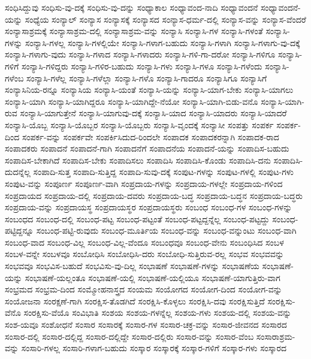{ಸಂಧಿಸಿದ್ದುವು
ಸಂಧಿಸು-ವು-ದಕ್ಕೆ
ಸಂಧಿಸು-ವು-ದನ್ನು
ಸಂಧ್ಯಾಕಾಲ
ಸಂಧ್ಯಾವಂದ-ನಾದಿ
ಸಂಧ್ಯಾವಂದನೆ
ಸಂಧ್ಯಾವಂದನೆ-ಯನ್ನು
ಸಂಧ್ಯೆಯ
ಸಂನ್ಯಾಲ್
ಸಂನ್ಯಾಸ
ಸಂನ್ಯಾಸಕ್ಕೆ
ಸಂನ್ಯಾಸದ
ಸಂನ್ಯಾಸ-ಧರ್ಮ-ದಲ್ಲಿ
ಸಂನ್ಯಾಸ-ವನ್ನು
ಸಂನ್ಯಾಸ-ವೆಂದರೆ
ಸಂನ್ಯಾಸಾಶ್ರಮಕ್ಕೆ
ಸಂನ್ಯಾಸಾಶ್ರಮ-ದಲ್ಲಿ
ಸಂನ್ಯಾಸಾಶ್ರಮ-ವನ್ನು
ಸಂನ್ಯಾಸಿ
ಸಂನ್ಯಾಸಿ-ಗಳ
ಸಂನ್ಯಾಸಿ-ಗಳಂತೆ
ಸಂನ್ಯಾಸಿ-ಗಳನ್ನು
ಸಂನ್ಯಾಸಿ-ಗಳಲ್ಲ
ಸಂನ್ಯಾಸಿ-ಗಳಲ್ಲಿಯೇ
ಸಂನ್ಯಾಸಿ-ಗಳಾಗ-ಬಹುದು
ಸಂನ್ಯಾಸಿ-ಗಳಾಗಿ
ಸಂನ್ಯಾಸಿ-ಗಳಾಗು-ವು-ದಕ್ಕೆ
ಸಂನ್ಯಾಸಿ-ಗಳಾಗು-ವುದು
ಸಂನ್ಯಾಸಿ-ಗಳಾದ
ಸಂನ್ಯಾಸಿ-ಗಳಾದರು
ಸಂನ್ಯಾಸಿ-ಗಳಿ-ಗಾ-ದರೋ
ಸಂನ್ಯಾಸಿ-ಗಳಿಗೂ
ಸಂನ್ಯಾಸಿ-ಗಳಿಗೆ
ಸಂನ್ಯಾಸಿ-ಗಳಿದ್ದರು
ಸಂನ್ಯಾಸಿ-ಗಳಿರ-ಬಹುದು
ಸಂನ್ಯಾಸಿ-ಗಳು
ಸಂನ್ಯಾಸಿ-ಗಳೂ
ಸಂನ್ಯಾಸಿ-ಗಳೆಂದು
ಸಂನ್ಯಾಸಿ-ಗಳೆಂಬ
ಸಂನ್ಯಾಸಿ-ಗಳೆಲ್ಲ
ಸಂನ್ಯಾಸಿ-ಗಳೆಲ್ಲಾ
ಸಂನ್ಯಾಸಿ-ಗಳೊ
ಸಂನ್ಯಾಸಿ-ಗಾದರೂ
ಸಂನ್ಯಾಸಿಗೂ
ಸಂನ್ಯಾಸಿಗೆ
ಸಂನ್ಯಾಸಿನಿಯ-ರನ್ನೂ
ಸಂನ್ಯಾಸಿಯ
ಸಂನ್ಯಾಸಿ-ಯಂತೆ
ಸಂನ್ಯಾಸಿ-ಯನ್ನು
ಸಂನ್ಯಾಸಿ-ಯಾಗ-ಬೇಕು
ಸಂನ್ಯಾಸಿ-ಯಾಗಲು
ಸಂನ್ಯಾಸಿ-ಯಾಗಿ
ಸಂನ್ಯಾಸಿ-ಯಾಗಿದ್ದರೂ
ಸಂನ್ಯಾಸಿ-ಯಾಗಿದ್ದೇ-ನೆಯೋ
ಸಂನ್ಯಾಸಿ-ಯಾಗಿ-ಬಿಡು-ವನೊ
ಸಂನ್ಯಾಸಿ-ಯಾಗಿ-ರುವ
ಸಂನ್ಯಾಸಿ-ಯಾಗುತ್ತೇನೆ
ಸಂನ್ಯಾಸಿ-ಯಾಗುವು-ದಕ್ಕೆ
ಸಂನ್ಯಾಸಿ-ಯಾದ
ಸಂನ್ಯಾಸಿ-ಯಾದರು
ಸಂನ್ಯಾಸಿ-ಯಾದರೆ
ಸಂನ್ಯಾಸಿ-ಯೊಬ್ಬ
ಸಂನ್ಯಾಸಿ-ಯೊಬ್ಬರ
ಸಂನ್ಯಾಸಿ-ಯೊಬ್ಬರು
ಸಂನ್ಯಾಸಿ-ವೃಂದಕ್ಕೆ
ಸಂನ್ಯಾಸೀ
ಸಂಪತ್ತು
ಸಂಪರ್ಕ
ಸಂಪರ್ಕ-ದಿಂದ
ಸಂಪರ್ಕ-ವನ್ನು
ಸಂಪರ್ಕವೇ
ಸಂಪರ್ಕಿಸಿದುದ-ರಿಂದಲೇ
ಸಂಪಾದಕ
ಸಂಪಾದಕರನ್ನಾಗಿ
ಸಂಪಾದಕ-ರಾದ
ಸಂಪಾದಕರು
ಸಂಪಾದನೆ
ಸಂಪಾದನೆ-ಗಾಗಿ
ಸಂಪಾದನೆಗೆ
ಸಂಪಾದನೆಯ
ಸಂಪಾದನೆ-ಯನ್ನು
ಸಂಪಾದಿಸ-ಬಹುದು
ಸಂಪಾದಿಸ-ಬೇಕಾಗಿದೆ
ಸಂಪಾದಿಸ-ಬೇಕು
ಸಂಪಾದಿಸಲು
ಸಂಪಾದಿಸಿ
ಸಂಪಾದಿಸಿ-ಕೊಂಡು
ಸಂಪಾದಿಸಿ-ದನು
ಸಂಪಾದಿಸಿ-ದುದನ್ನೆಲ್ಲ
ಸಂಪಾದಿ-ಸುತ್ತ
ಸಂಪಾದಿ-ಸುತ್ತಿದ್ದ
ಸಂಪಾದಿ-ಸುವು-ದಕ್ಕೆ
ಸಂಪುಟ-ಗಳನ್ನು
ಸಂಪುಟ-ಗಳಲ್ಲಿ
ಸಂಪುಟ-ಗಳು
ಸಂಪುಟ-ವನ್ನು
ಸಂಪೂರ್ಣ
ಸಂಪೂರ್ಣ-ವಾಗಿ
ಸಂಪ್ರದಾಯ-ಗಳನ್ನು
ಸಂಪ್ರದಾಯ-ಗಳಲ್ಲೇ
ಸಂಪ್ರದಾಯ-ಗಳಿಂದ
ಸಂಪ್ರದಾಯದ
ಸಂಪ್ರದಾಯ-ದಲ್ಲಿ
ಸಂಪ್ರದಾಯ-ದವರು
ಸಂಪ್ರದಾಯ-ಬದ್ಧ
ಸಂಪ್ರದಾಯ-ಬದ್ಧನ
ಸಂಪ್ರದಾಯ-ಬದ್ಧರು
ಸಂಪ್ರದಾಯ-ವನ್ನು
ಸಂಪ್ರದಾಯಸ್ಥ
ಸಂಪ್ರದಾಯಸ್ಥರ
ಸಂಪ್ರದಾಯಸ್ಥರು
ಸಂಬಂಧ
ಸಂಬಂಧ-ಗಳ
ಸಂಬಂಧ-ಗಳನ್ನು
ಸಂಬಂಧದ
ಸಂಬಂಧ-ದಲ್ಲಿ
ಸಂಬಂಧ-ಪಟ್ಟ
ಸಂಬಂಧ-ಪಟ್ಟಂತೆ
ಸಂಬಂಧ-ಪಟ್ಟದ್ದನ್ನೆಲ್ಲ
ಸಂಬಂಧ-ಪಟ್ಟದ್ದು
ಸಂಬಂಧ-ಪಟ್ಟಿದ್ದನ್ನೂ
ಸಂಬಂಧ-ಪಟ್ಟಿ-ರುವುದು
ಸಂಬಂಧ-ಮೂರ್ತಿಯ
ಸಂಬಂಧ-ವನ್ನು
ಸಂಬಂಧ-ವನ್ನುಂಟು
ಸಂಬಂಧ-ವಾಗಿ
ಸಂಬಂಧ-ವಾದ
ಸಂಬಂಧ-ವಿಲ್ಲ
ಸಂಬಂಧ-ವಿಲ್ಲ-ವೆಂದೂ
ಸಂಬಂಧವೂ
ಸಂಬಂಧ-ವೇನು
ಸಂಬಂಧಿಸಿದ
ಸಂಬಳ
ಸಂಬಳ-ವನ್ನೇ
ಸಂಬಳವೂ
ಸಂಬೋಧಿಸಿ
ಸಂಬೋಧಿಸಿ-ದರು
ಸಂಬೋಧಿ-ಸುತ್ತಿರುವ-ರಲ್ಲ
ಸಂಭವ
ಸಂಭವವನ್ನು
ಸಂಭವವೂ
ಸಂಭವಿಸ-ಬಹುದೆ
ಸಂಭವಿಸು-ವು-ದಿಲ್ಲ
ಸಂಭಾಷಣೆ
ಸಂಭಾಷಣೆ-ಗಳನ್ನು
ಸಂಭಾಷಣೆಯ
ಸಂಭಾಷಣೆ-ಯನ್ನು
ಸಂಭಾಷಣೆ-ಯಲ್ಲಂತೂ
ಸಂಭಾಷಣೆ-ಯಲ್ಲಿ
ಸಂಭಾಷಣೆ-ಯಲ್ಲಿಯೂ
ಸಂಭಾಷಣೆ-ಯಾಗುತ್ತಿರು-ವಾಗ
ಸಂಭ್ರಮದ
ಸಂಭ್ರಮ-ದಿಂದ
ಸಂಮ್ಮೋಹನಾಸ್ತ್ರದ
ಸಂಯಮ
ಸಂಯೋಗದ
ಸಂಯೋಗ-ದಿಂದ
ಸಂಯೋಗ-ವನ್ನು
ಸಂಯೋಜನಾ
ಸಂರಕ್ಷಣೆ-ಗಾಗಿ
ಸಂರಕ್ಷಿಸ-ತೊಡಗಿದೆ
ಸಂರಕ್ಷಿಸಿ-ಕೊಳ್ಳಲು
ಸಂರಕ್ಷಿಸಿ-ದವು
ಸಂರಕ್ಷಿಸುತ್ತಿದೆ
ಸಂರಕ್ಷಿಸು-ವೆನೊ
ಸಂರಕ್ಷಿಸು-ವೆಯೊ
ಸಂವಿಭಾತಿ
ಸಂಶಯ
ಸಂಶಯ-ಗಳನ್ನೆಲ್ಲ
ಸಂಶಯ-ಗಳು
ಸಂಶಯ-ದಲ್ಲಿ
ಸಂಶಯ-ವನ್ನು
ಸಂಶ-ಯವೂ
ಸಂಶೋಧನೆ
ಸಂಸಾರ
ಸಂಸಾರಕ್ಕೆ
ಸಂಸಾರ-ಗಳ
ಸಂಸಾರ-ಚಕ್ರ-ವನ್ನು
ಸಂಸಾರ-ಜೀವನದ
ಸಂಸಾರದ
ಸಂಸಾರ-ದಲ್ಲಿ
ಸಂಸಾರ-ದಲ್ಲಿದ್ದ
ಸಂಸಾರ-ದಲ್ಲಿದ್ದೇ
ಸಂಸಾರ-ದಲ್ಲಿರು
ಸಂಸಾರ-ವನ್ನು
ಸಂಸಾರ-ವೆಂಬ
ಸಂಸಾರಾಶ್ರಮ-ವನ್ನು
ಸಂಸಾರಿ-ಗಳಲ್ಲ
ಸಂಸಾರಿ-ಗಳಾಗ-ಬಹುದು
ಸಂಸ್ಕಾರ
ಸಂಸ್ಕಾರಕ್ಕೆ
ಸಂಸ್ಕಾರ-ಗಳಿಗೆ
ಸಂಸ್ಕಾರ-ಗಳು
ಸಂಸ್ಕಾರದ
}
